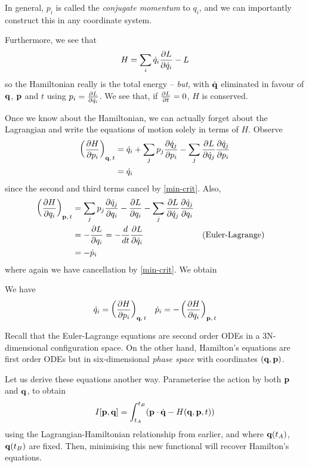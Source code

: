 \documentclass{../../template/note}
\begin{document}
    In general, $p_i$ is called the \emph{conjugate momentum} to $q_i$, and we can importantly construct this in any coordinate system.

    Furthermore, we see that
    \begin{align*}
        H = \sum_i \dot q_i \pd{L}{\dot q_i} - L
    \end{align*}
    so the Hamiltonian really is the total energy -- \emph{but}, with $\dot{\V q}$ eliminated in favour of $\V q$, $\V p$ and $t$ using $p_i = \pd{L}{\dot q_i}$. We see that, if $\pd{L}{t} = 0$, $H$ is conserved.

    Once we know about the Hamiltonian, we can actually forget about the Lagrangian and write the equations of motion solely in terms of $H$. Observe
    \begin{align*}
        \left(\pd{H}{p_i}\right)_{\V q,\, t} &= \dot q_i + \sum_j p_j \pd{\dot q_j}{p_i} - \sum_j \pd{L}{\dot q_j} \pd{\dot q_j}{p_i} \\
        &= \dot q_i
    \end{align*}
    since the second and third terms cancel by \cref{min-crit}. Also,
    \begin{align*}
        \left(\pd{H}{q_i}\right)_{\V p,\, t} &= \sum_j p_j \pd{\dot q_j}{q_i} - \pd{L}{q_i} - \sum_j \pd{L}{\dot q_j} \pd{\dot q_j}{q_i} \\
        &= -\pd{L}{q_i} = -\frac{d}{dt} \pd{L}{\dot q_i} && \text{(Euler-Lagrange)} \\
        &= -\dot p_i
    \end{align*}
    where again we have cancellation by \cref{min-crit}. We obtain
    \begin{proposition}
        We have
        \begin{align*}
            \dot q_i = \left(\pd{H}{p_i}\right)_{\V q,\, t} && \dot p_i = -\left(\pd{H}{q_i}\right)_{\V p,\, t}
        \end{align*}
    \end{proposition}
    Recall that the Euler-Lagrange equations are second order ODEs in a 3N-dimensional configuration space. On the other hand, Hamilton's equations are first order ODEs but in six-dimensional \emph{phase space} with coordinates $(\V q, \V p)$.

    Let us derive these equations another way. Parameterise the action by both $\V p$ and $\V q$, to obtain
    \begin{align*}
        I[\V p, \V q] = \int_{t_A}^{t_B} (\V p \cdot \dot{\V q} - H(\V q, \V p, t))
    \end{align*}
    using the Lagrangian-Hamiltonian relationship from earlier, and where $\V q(t_A)$, $\V q(t_B)$ are fixed. Then, minimising this new functional will recover Hamilton's equations.
    
\end{document}
